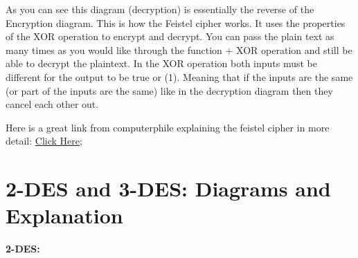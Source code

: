 \documentclass{article}
\begin{document}

As you can see this diagram (decryption) is essentially the reverse of the Encryption diagram. This is how the Feistel cipher works. It uses the properties of the XOR operation to encrypt and decrypt. You can pass the plain text as many times as you would like through the function + XOR operation and still be able to decrypt the plaintext. In the XOR operation both inputs must be different for the output to be true or (1). Meaning that if the inputs are the same (or part of the inputs are the same) like in the decryption diagram then they cancel each other out.

\vspace{2em} %

Here is a great link from computerphile explaining the feistel cipher in more detail: 
\href{https://www.youtube.com/watch?v=FGhj3CGxl8I&t=29s}{Click Here};


\vspace{15em} %

\section*{2-DES and 3-DES: Diagrams and Explanation}

\textbf{2-DES:}
\vspace{0.3cm}

\end{document}
